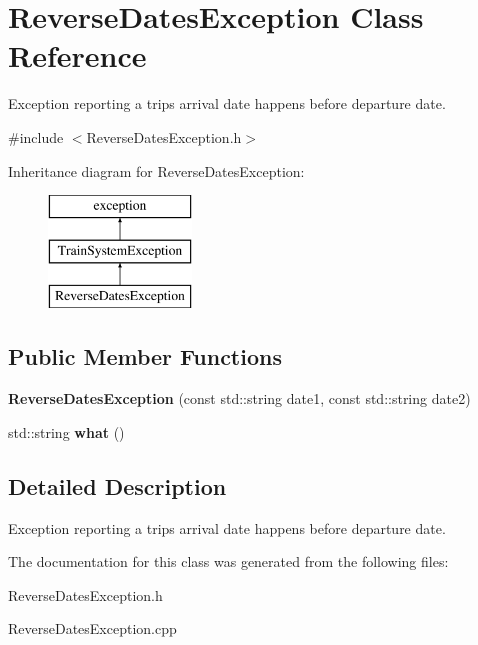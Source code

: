 \hypertarget{classReverseDatesException}{}\section{Reverse\+Dates\+Exception Class Reference}
\label{classReverseDatesException}


Exception reporting a trip\textquotesingle{}s arrival date happens before departure date.  




{\ttfamily \#include $<$Reverse\+Dates\+Exception.\+h$>$}

Inheritance diagram for Reverse\+Dates\+Exception\+:\begin{figure}[H]
\begin{center}
\leavevmode
\includegraphics[height=3.000000cm]{classReverseDatesException}
\end{center}
\end{figure}
\subsection*{Public Member Functions}
\begin{DoxyCompactItemize}
\item 
\mbox{\label{classReverseDatesException_afc245532384383f8f62b20358326c773}} 
{\bfseries Reverse\+Dates\+Exception} (const std\+::string date1, const std\+::string date2)
\item 
\mbox{\label{classReverseDatesException_a1beb55d765fec9ceca0d8e1d73486ae5}} 
std\+::string {\bfseries what} ()
\end{DoxyCompactItemize}


\subsection{Detailed Description}
Exception reporting a trip\textquotesingle{}s arrival date happens before departure date. 

The documentation for this class was generated from the following files\+:\begin{DoxyCompactItemize}
\item 
Reverse\+Dates\+Exception.\+h\item 
Reverse\+Dates\+Exception.\+cpp\end{DoxyCompactItemize}
